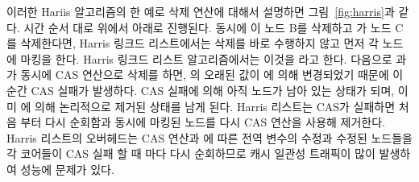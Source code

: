 이러한 Hariis 알고리즘의 한 예로 삭제 연산에 대해서 설명하면 그림~\ref{fig:harris}과 같다. 
시간 순서 대로 위에서 아래로 진행된다.
동시에 이 노드 B를 삭제하고 가 노드 C를 삭제한다면,
Harris 링크드 리스트에서는 삭제를 바로 수행하지 않고 먼저 각 노드에 마킹을 한다. 
Harris 링크드 리스트 알고리즘에서는 이것을 라고 한다.
다음으로 과 가 동시에 CAS 연산으로 삭제를 하면, 의 오래된 값이 
에 의해 변경되었기 때문에 이 순간 CAS 실패가 발생하다. 
CAS 실패에 의해 아직 노드가 남아 있는 상태가 되며, 이미 에 의해 
논리적으로 제거된 상태를 남게 된다.  
Harris 리스트는 CAS가 실패하면 처음 부터 다시 순회함과 동시에 마킹된 노드를 다시 CAS 연산을 사용해 
제거한다.
Harris 리스트의 오버헤드는 CAS 연산과 에 따른 전역 변수의 수정과 
수정된 노드들을 각 코어들이 CAS 실패 할 때 마다 다시 순회하므로 캐시 일관성 트래픽이 
많이 발생하여 성능에 문제가 있다.



